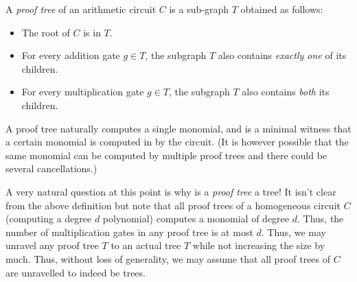 \begin{definition}\label{defn:proof-tree}
A \emph{proof tree} of an arithmetic circuit $C$ is a sub-graph $T$ obtained as follows:
\begin{itemize}
\item The root of $C$ is in $T$.
\item For every addition gate $g\in T$, the subgraph $T$ also contains \emph{exactly one} of its children.
\item For every multiplication gate $g\in T$, the subgraph $T$ also contains \emph{both} its children. 
\end{itemize}
\end{definition}

A proof tree naturally computes a single monomial, and is a minimal witness that a certain monomial is computed in by the circuit. (It is however possible that the same monomial can be computed by multiple proof trees and there could be several cancellations.)

A very natural question at this point is why is a \emph{proof tree} a tree! It isn't clear from the above definition but note that all proof trees of a homogeneous circuit $C$ (computing a degree $d$ polynomial) computes a monomial of degree $d$. Thus, the number of multiplication gates in any proof tree is at most $d$. Thus, we may unravel any proof tree $T$ to an actual tree $T$ while not increasing the size by much. Thus, without loss of generality, we may assume that all proof trees of $C$ are unravelled to indeed be trees. 


